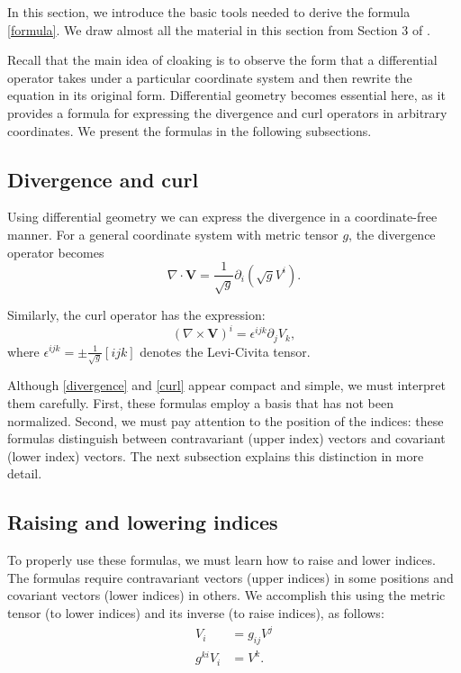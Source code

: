 In this section, we introduce the basic tools needed to derive the formula
\eqref{formula}. We draw almost all the material in this section from
Section 3 of \cite{leonhardtGeometryLightScience2010}.

Recall that the main idea of cloaking is to observe the form that a
differential operator takes under a particular coordinate system and then
rewrite the equation in its original form. Differential geometry becomes
essential here, as it provides a formula for expressing the
divergence and curl operators in arbitrary coordinates. We present the formulas
in the following subsections.

\subsection{Divergence and curl}

Using differential geometry we can express the divergence in a coordinate-free
manner. For a general coordinate system with metric tensor \(g\), the
divergence operator becomes
\begin{equation}\label{divergence}
	\nabla\cdot \boldsymbol{V} = \frac{1}{\sqrt{g}}\partial_i
	\left(\sqrt{g} V^i\right).
\end{equation}

Similarly, the curl operator has the expression:
\begin{equation}\label{curl}
\left(\nabla\times \boldsymbol{V}\right)^i =\epsilon^{ijk}\partial_jV_k,
\end{equation}
where \(\epsilon^{ijk}=\pm\frac{1}{\sqrt{g}}[ijk]\) denotes the Levi-Civita tensor.

Although \eqref{divergence} and \eqref{curl} appear compact and simple,
we must interpret them carefully. First, these formulas employ a basis that has not been
normalized. Second, we must pay attention to the position of the indices:
these formulas distinguish between contravariant (upper index) vectors and
covariant (lower index) vectors. The next subsection explains this distinction in more detail.

\subsection{Raising and lowering indices}

To properly use these formulas, we must learn how to raise and lower
indices. The formulas require contravariant vectors (upper indices) in some
positions and covariant vectors (lower indices) in others. We accomplish this
using the metric tensor (to lower indices) and its inverse (to raise
indices), as follows:
\begin{align*}
	V_i&=g_{ij}V^j\\
	g^{ki}V_i&=V^k.
\end{align*}

